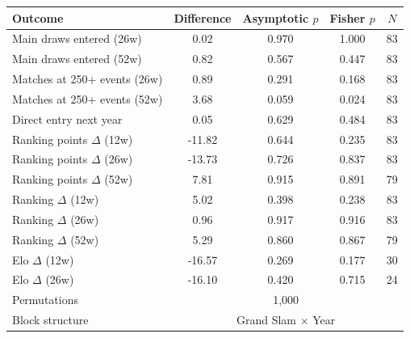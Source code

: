\begin{tabular}{l cccc}
\toprule
Outcome & Difference & Asymptotic $p$ & Fisher $p$ & $N$ \\
\midrule
Main draws entered (26w) & 0.02 & 0.970 & 1.000 & 83 \\
Main draws entered (52w) & 0.82 & 0.567 & 0.447 & 83 \\
Matches at 250+ events (26w) & 0.89 & 0.291 & 0.168 & 83 \\
Matches at 250+ events (52w) & 3.68 & 0.059 & 0.024 & 83 \\
Direct entry next year & 0.05 & 0.629 & 0.484 & 83 \\
Ranking points $\Delta$ (12w) & -11.82 & 0.644 & 0.235 & 83 \\
Ranking points $\Delta$ (26w) & -13.73 & 0.726 & 0.837 & 83 \\
Ranking points $\Delta$ (52w) & 7.81 & 0.915 & 0.891 & 79 \\
Ranking $\Delta$ (12w) & 5.02 & 0.398 & 0.238 & 83 \\
Ranking $\Delta$ (26w) & 0.96 & 0.917 & 0.916 & 83 \\
Ranking $\Delta$ (52w) & 5.29 & 0.860 & 0.867 & 79 \\
Elo $\Delta$ (12w) & -16.57 & 0.269 & 0.177 & 30 \\
Elo $\Delta$ (26w) & -16.10 & 0.420 & 0.715 & 24 \\
\midrule
Permutations & \multicolumn{4}{c}{1,000} \\
Block structure & \multicolumn{4}{c}{Grand Slam $\times$ Year} \\
\bottomrule
\end{tabular}
